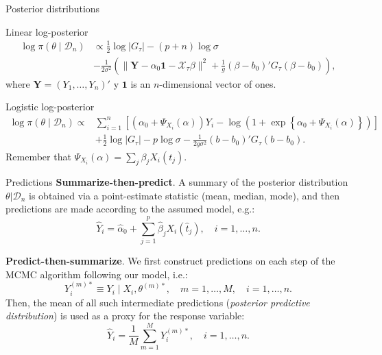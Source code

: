 \documentclass[10pt, english, professionalfonts]{beamer}
\newcommand\maroon[1]{\color{mLightBrown}#1\color{mDarkTeal}}
\begin{document}
\begin{frame}{Posterior distributions}
  \begin{block}{Linear log-posterior}
    \vspace{-1em}
    \begin{align*}
  \log \pi(\theta\mid \mathcal D_n) &\propto \frac{1}{2}\log |G_\tau| - (p+n)\log \sigma\\
  &-\frac{1}{2\sigma^2} \left(\|\boldsymbol{Y}-\alpha_0\boldsymbol{1} - \mathcal X_\tau\beta\|^2 + \frac{1}{g}(\beta - b_0)'G_\tau(\beta - b_0) \right),
\end{align*}
where \(\bm Y=(Y_1,\dots,Y_n)'\) y \(\bm{1}\) is an \(n\)-dimensional vector of ones.
  \end{block}

\vspace{1em}
  \begin{block}{Logistic log-posterior}
      \vspace{-1em}
    \begin{align*}
  \log \pi(\theta \mid \mathcal D_n) \propto {} & \sum_{i=1}^n \left[ \left(\alpha_0 + \Psi_{X_i}(\alpha)\right)Y_i - \log\left(1 + \exp\left\{\alpha_0 + \Psi_{X_i}(\alpha)\right\}\right)\right]\\
  \quad &+ \frac{1}{2}\log |G_\tau| - p\log \sigma -\frac{1}{2g\sigma^2} (b - b_0)'G_\tau(b - b_0).
\end{align*}
Remember that \(\Psi_{X_i}(\alpha) = \sum_j \beta_j X_i(t_j)\).
  \end{block}
\end{frame}

%
%

\begin{frame}{Predictions}
  \textbf{Summarize-then-predict}. A summary of the posterior distribution \(\theta| \mathcal D_n\) is obtained via a point-estimate statistic (mean, median, mode), and then predictions are made according to the assumed model, e.g.:
  \[
  \hat Y_i =\hat \alpha_0 + \sum_{j=1}^p \hat \beta_j X_i(\hat t_j), \quad i=1,\dots, n.
  \]

  \textbf{Predict-then-summarize}. We first construct predictions on each step of the MCMC algorithm following our model, i.e.:
  \[
    Y_i^{(m)*} \equiv Y_i \mid X_i, \theta^{(m)*}, \quad m=1,\dots,M, \quad i=1,\dots, n.
  \]
  Then, the mean of all such intermediate predictions (\textit{posterior predictive distribution}) is used as a proxy for the response variable:
  \[
    \hat Y_i = \frac{1}{M}\sum_{m=1}^M Y_i^{(m)*}, \quad i=1,\dots, n.
  \]

\end{frame}
\end{document}
